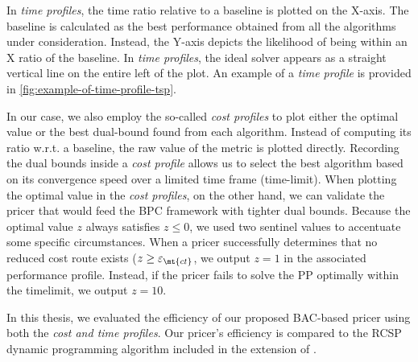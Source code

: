 In \textit{time profiles}, the time ratio relative to a baseline is plotted on the X-axis.
The baseline is calculated as the best performance obtained from all the algorithms under consideration.
Instead, the Y-axis depicts the likelihood of being within an X ratio of the baseline.
In \textit{time profiles}, the ideal solver appears as a straight vertical line on the entire left of the plot.
An example of a \textit{time profile} is provided in \cref{fig:example-of-time-profile-tsp}.

In our case, we also employ the so-called \textit{cost profiles} to plot either the optimal value
or the best dual-bound found from each algorithm.
Instead of computing its ratio w.r.t. a baseline, the raw value of the metric is plotted directly.
Recording the dual bounds inside a \textit{cost profile}
allows us to select the best algorithm
based on its convergence speed over a limited time frame (time-limit).
When plotting the optimal value in the \textit{cost profiles}, on the other hand,
we can validate the pricer that would feed the BPC framework with tighter dual bounds.
Because the optimal value $z$ always satisfies $z \le 0$,
we used two sentinel values to accentuate some specific circumstances.
When a pricer successfully determines that no reduced cost route exists
($z \ge \varepsilon_{\mt{ct}}$,
we output $z = 1$ in the associated performance profile.
Instead, if the pricer fails to solve the PP optimally within the timelimit,
we output $z = 10$.

\medskip

In this thesis, we evaluated the efficiency of our proposed BAC-based pricer
using both the \textit{cost and time profiles}.
Our pricer's efficiency is compared to the RCSP dynamic programming algorithm
included in the \vrpsolver{} extension \parencite{pessoa2020generic} of \bapcod{}.

